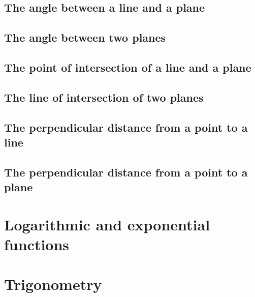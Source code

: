 \subsection{The angle between a line and a plane}
\subsection{The angle between two planes}


\subsection{The point of intersection of a line and a plane}
\subsection{The line of intersection of two planes}


\subsection{The perpendicular distance from a point to a line}




\subsection{The perpendicular distance from a point to a plane}
   












\section{Logarithmic and exponential functions}

\section{Trigonometry}




